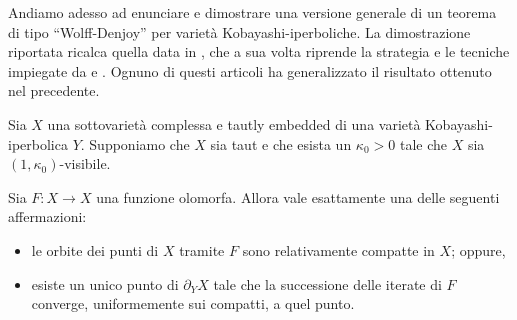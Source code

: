 Andiamo adesso ad enunciare e dimostrare una versione generale di un teorema di tipo ``Wolff-Denjoy'' per varietà Kobayashi-iperboliche. La dimostrazione riportata ricalca quella data in \cite{CMS}, che a sua volta riprende la strategia e le tecniche impiegate da \cite{BZ1} e \cite{BM}. Ognuno di questi articoli ha generalizzato il risultato ottenuto nel precedente.

\begin{thm} \label{wd_type_strong}
    Sia $X$ una sottovarietà complessa e tautly embedded di una varietà Kobayashi-iperbolica $Y$. Supponiamo che $X$ sia taut e che esista un $\kappa_0>0$ tale che $X$ sia $(1,\kappa_0)$-visibile.
    
    Sia $F:X \longrightarrow X$ una funzione olomorfa. Allora vale esattamente una delle seguenti affermazioni:
    \begin{itemize}
        \item le orbite dei punti di $X$ tramite $F$ sono relativamente compatte in $X$; oppure,
        \item esiste un unico punto di $\partial_YX$ tale che la successione delle iterate di $F$ converge, uniformemente sui compatti, a quel punto.
    \end{itemize}
\end{thm}

